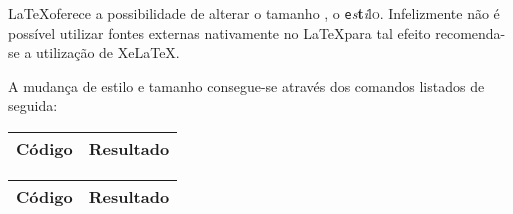 \LaTeX oferece a possibilidade de alterar o \huge{t}\large{a}\normalsize{m}\small{a}\footnotesize{n}\scriptsize{h}\Huge{o}\normalsize{} , o \texttt{e}\textsl{s}\textbf{t}\textit{i}\textsf{l}\textsc{o}. Infelizmente não é possível utilizar fontes externas nativamente no \LaTeX para tal efeito recomenda-se a utilização de Xe\LaTeX.

A mudança de estilo e tamanho consegue-se através dos comandos listados de seguida:
\begin{table}[h]
\center
\begin{tabular}{|c|c|}
\hline
Código & Resultado \\ \hline

\end{tabular}

\end{table}
\begin{table}[h]
\center
\begin{tabular}{|c|c|}
\hline
Código & Resultado \\ \hline

\end{tabular}
\end{table}

